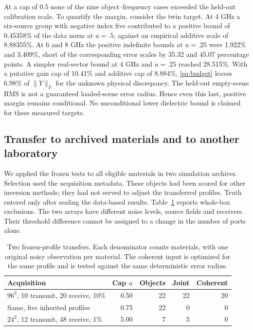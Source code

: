 \documentclass[anonymous,12pt]{iopjournal}
\theoremstyle{remark}\newtheorem{remark}[theorem]{Remark}
\numberwithin{equation}{section}
\begin{document}
At a cap of 0.5 none of the nine object--frequency cases exceeded the held-out calibration scale. To quantify the margin, consider the twin target. At 4 GHz a six-source group with negative index five contributed to a positive bound of 0.45358\% of the data norm at $u=.5$, against an empirical additive scale of 8.88355\%. At 6 and 8 GHz the positive indefinite bounds at $u=.25$ were 1.922\% and 3.409\%, short of the corresponding error scales by 35.32 and 45.07 percentage points. A simpler real-sector bound at 4 GHz and $u=.25$ reached 28.515\%. With a putative gain cap of 10.41\% and additive cap of 8.884\%, \eqref{eq:budget} leaves 6.98\% of $\|Y\|_F$ for the unknown physical discrepancy. The held-out empty-scene RMS is not a guaranteed loaded-scene error radius. Hence even this last, positive margin remains conditional. No unconditional lower dielectric bound is claimed for these measured targets.

\subsection{Transfer to archived materials and to another laboratory}
We applied the frozen tests to all eligible materials in two simulation archives. Selection used the acquisition metadata. These objects had been scored for other inversion methods; they had not served to adjust the transferred profiles. Truth entered only after sealing the data-based results. Table~\ref{tab:transfer} reports whole-box exclusions. The two arrays have different noise levels, source fields and receivers. Their threshold difference cannot be assigned to a change in the number of ports alone.

\begin{table}[tbp]
\centering\small
\caption{Two frozen-profile transfers. Each denominator counts materials, with one original noisy observation per material. The coherent input is optimized for the same profile and is tested against the same deterministic error radius.}
\label{tab:transfer}
\begin{tabular}{lrrrr}
\toprule
Acquisition & Cap $u$ & Objects & Joint & Coherent\\
\midrule
$96^2$, 10 transmit, 20 receive, 10\% & 0.50 & 22 & 22 & 20\\
Same, five inherited profiles & 0.75 & 22 & 0 & 0\\
$24^2$, 12 transmit, 48 receive, 1\% & 5.00 & 7 & 5 & 0\\
\bottomrule
\end{tabular}
\end{table}
\end{document}
